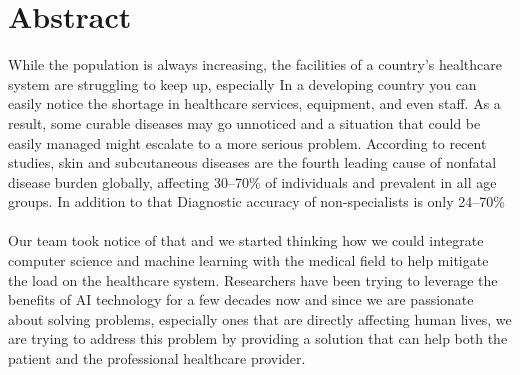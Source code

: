 \chapter*{Abstract}
While the population is always increasing, the facilities of a country's healthcare system are struggling to keep up, especially In a developing country you can easily notice the shortage in healthcare services, equipment, and even staff.
As a result, some curable diseases may go unnoticed and a situation that could be easily managed might escalate to a more serious problem. 
According to recent studies, skin and subcutaneous diseases are the fourth leading cause of nonfatal disease burden globally, affecting 30–70\% of individuals and prevalent in all age groups. In addition to that Diagnostic accuracy of non-specialists is only 24–70\% \\\\
Our team took notice of that and we started thinking how we could integrate computer science and machine learning with the medical field to help mitigate the load on the healthcare system. 
Researchers have been trying to leverage the benefits of AI technology for a few decades now and since we are passionate about solving problems, especially ones that are directly affecting human lives, we are trying to address this problem by providing a solution that can help both the patient and the professional healthcare provider.